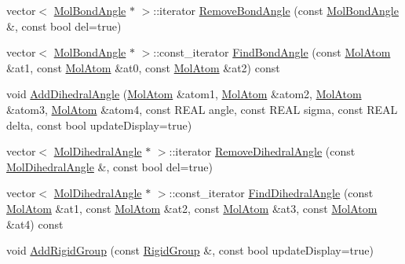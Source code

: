 \begin{DoxyCompactItemize}
\item 
vector$<$ \mbox{\hyperlink{class_obj_cryst_1_1_mol_bond_angle}{Mol\+Bond\+Angle}} $\ast$ $>$\+::iterator \mbox{\hyperlink{class_obj_cryst_1_1_molecule_a07ae7127f13c0527530074756093a653}{Remove\+Bond\+Angle}} (const \mbox{\hyperlink{class_obj_cryst_1_1_mol_bond_angle}{Mol\+Bond\+Angle}} \&, const bool del=true)
\item 
vector$<$ \mbox{\hyperlink{class_obj_cryst_1_1_mol_bond_angle}{Mol\+Bond\+Angle}} $\ast$ $>$\+::const\+\_\+iterator \mbox{\hyperlink{class_obj_cryst_1_1_molecule_a5a9a7cfad7693ce55fa20be38f1a92c1}{Find\+Bond\+Angle}} (const \mbox{\hyperlink{class_obj_cryst_1_1_mol_atom}{Mol\+Atom}} \&at1, const \mbox{\hyperlink{class_obj_cryst_1_1_mol_atom}{Mol\+Atom}} \&at0, const \mbox{\hyperlink{class_obj_cryst_1_1_mol_atom}{Mol\+Atom}} \&at2) const
\item 
void \mbox{\hyperlink{class_obj_cryst_1_1_molecule_aae30adce9fdd16e42cab4f8e434f01cf}{Add\+Dihedral\+Angle}} (\mbox{\hyperlink{class_obj_cryst_1_1_mol_atom}{Mol\+Atom}} \&atom1, \mbox{\hyperlink{class_obj_cryst_1_1_mol_atom}{Mol\+Atom}} \&atom2, \mbox{\hyperlink{class_obj_cryst_1_1_mol_atom}{Mol\+Atom}} \&atom3, \mbox{\hyperlink{class_obj_cryst_1_1_mol_atom}{Mol\+Atom}} \&atom4, const R\+E\+AL angle, const R\+E\+AL sigma, const R\+E\+AL delta, const bool update\+Display=true)
\item 
vector$<$ \mbox{\hyperlink{class_obj_cryst_1_1_mol_dihedral_angle}{Mol\+Dihedral\+Angle}} $\ast$ $>$\+::iterator \mbox{\hyperlink{class_obj_cryst_1_1_molecule_a5603e0f2c58de705284f07903e4f597a}{Remove\+Dihedral\+Angle}} (const \mbox{\hyperlink{class_obj_cryst_1_1_mol_dihedral_angle}{Mol\+Dihedral\+Angle}} \&, const bool del=true)
\item 
vector$<$ \mbox{\hyperlink{class_obj_cryst_1_1_mol_dihedral_angle}{Mol\+Dihedral\+Angle}} $\ast$ $>$\+::const\+\_\+iterator \mbox{\hyperlink{class_obj_cryst_1_1_molecule_a6bc7da1865f3fd5adc42323fc44d292c}{Find\+Dihedral\+Angle}} (const \mbox{\hyperlink{class_obj_cryst_1_1_mol_atom}{Mol\+Atom}} \&at1, const \mbox{\hyperlink{class_obj_cryst_1_1_mol_atom}{Mol\+Atom}} \&at2, const \mbox{\hyperlink{class_obj_cryst_1_1_mol_atom}{Mol\+Atom}} \&at3, const \mbox{\hyperlink{class_obj_cryst_1_1_mol_atom}{Mol\+Atom}} \&at4) const
\item 
void \mbox{\hyperlink{class_obj_cryst_1_1_molecule_a8c61827ad3303aca5c0db6698a5f9e06}{Add\+Rigid\+Group}} (const \mbox{\hyperlink{class_obj_cryst_1_1_rigid_group}{Rigid\+Group}} \&, const bool update\+Display=true)
\item 

\end{DoxyCompactItemize}
